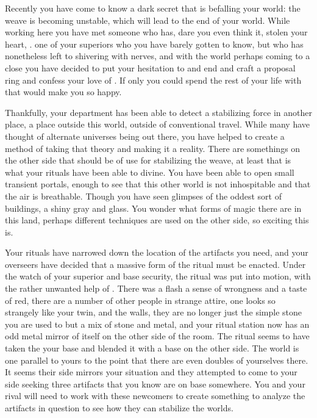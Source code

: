 \documentclass[char]{guildcamp3}
\begin{document}
Recently you have come to know a dark secret that is befalling your world: the weave is becoming unstable, which will lead to the end of your world. While working here you have met someone who has, dare you even think it, stolen your heart, \cNobleOne{\intro}. one of your superiors who you have barely gotten to know, but who has nonetheless left to shivering with nerves, and with the world perhaps coming to a close you have decided to put your hesitation to and end and craft a proposal ring and confess your love of \cNobleOne{\informal}. If only you could spend the rest of your life with \cNobleOne{\them} that would make you so happy. 

Thankfully, your department has been able to detect a stabilizing force in another place, a place outside this world, outside of conventional travel. While many have thought of alternate universes being out there, you have helped to create a method of taking that theory and making it a reality. There are somethings on the other side that should be of use for stabilizing the weave, at least that is what your rituals have been able to divine. You have been able to open small transient portals, enough to see that this other world is not inhospitable and that the air is breathable. Though you have seen glimpses of the oddest sort of buildings, a shiny gray and glass. You wonder what forms of magic there are in this land, perhaps different techniques are used on the other side, so exciting this is.

Your rituals have narrowed down the location of the artifacts you need, and your overseers have decided that a massive form of the ritual must be enacted. Under the watch of your superior \cNobleOne{\intro} and base security, the ritual was put into motion, with the rather unwanted help of \cMageTwo{}. There was a flash a sense of wrongness and a taste of red, there are a number of other people in strange attire, one looks so strangely like your twin, and the walls, they are no longer just the simple stone you are used to but a mix of stone and metal, and your ritual station now has an odd metal mirror of itself on the other side of the room. The ritual seems to have taken the your base and blended it with a base on the other side. The world is one parallel to yours to the point that there are even doubles of yourselves there. It seems their side mirrors your situation and they attempted to come to your side seeking three artifacts that you know are on base somewhere. You and your rival will need to work with these newcomers to create something to analyze the artifacts in question to see how they can stabilize the worlds. 
\end{document}
